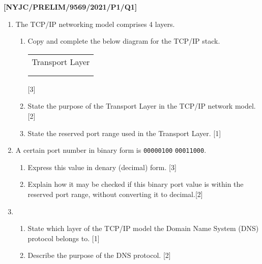 \item \textbf{{[}NYJC/PRELIM/9569/2021/P1/Q1{]} }
\begin{enumerate}
\item The TCP/IP networking model comprises 4 layers. 
\begin{enumerate}
\item Copy and complete the below diagram for the TCP/IP stack.
\noindent \begin{center}
\begin{tabular}{|c|}
\hline 
\tabularnewline
\hline 
Transport Layer\tabularnewline
\hline 
\tabularnewline
\hline 
\tabularnewline
\hline 
\end{tabular}
\par\end{center}

\hfill{}{[}3{]}
\item State the purpose of the Transport Layer in the TCP/IP network model.
\hfill{}{[}2{]}
\item State the reserved port range used in the Transport Layer. \hfill{}{[}1{]}
\end{enumerate}
\item A certain port number in binary form is \texttt{00000100} \texttt{00011000}. 
\begin{enumerate}
\item Express this value in denary (decimal) form. \hfill{}{[}3{]}
\item Explain how it may be checked if this binary port value is within
the reserved port range, without converting it to decimal.\hfill{}{[}2{]}
\end{enumerate}
\item {}
\begin{enumerate}
\item State which layer of the TCP/IP model the Domain Name System (DNS)
protocol belongs to.\hfill{} {[}1{]}
\item Describe the purpose of the DNS protocol. \hfill{}{[}2{]}
\end{enumerate}
\end{enumerate}